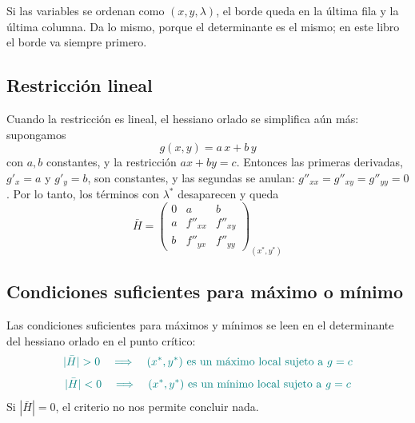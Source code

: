 \documentclass{article}
\begin{document}
Si las variables se ordenan como \((x,y,\lambda)\), el borde queda en la última fila y la última columna. Da lo mismo, porque el determinante es el mismo; en este libro el borde va siempre primero.

\subsection*{Restricción lineal}

Cuando la restricción es lineal, el hessiano orlado se simplifica aún más: supongamos
\[
g(x,y)=a\,x+b\,y
\]
con \(a,b\) constantes, y la restricción \(ax+by=c\). Entonces las primeras derivadas, \(g'_x=a\) y \(g'_y=b\), son constantes, y las segundas se anulan: \(g''_{xx}=g''_{xy}=g''_{yy}=0\). Por lo tanto, los términos con \(\lambda^*\) desaparecen y queda
\[
\bar H
=
\begin{pmatrix}
0 & a & b \\[6pt]
a & f''_{xx} & f''_{xy} \\[6pt]
b & f''_{yx} & f''_{yy}
\end{pmatrix}_{(x^*,y^*)}
\]

\subsection*{Condiciones suficientes para máximo o mínimo}

Las condiciones suficientes para máximos y mínimos se leen en el determinante del hessiano orlado en el punto crítico:
\[\color{teal}
|\bar H|>0
\quad\Longrightarrow\quad
\text{\((x^*,y^*)\) es un máximo local sujeto a }g=c
\]
\[\color{teal}
|\bar H|<0
\quad\Longrightarrow\quad
\text{\((x^*,y^*)\) es un mínimo local sujeto a }g=c
\]
Si \(|\bar H|=0\), el criterio no nos permite concluir nada.

\medskip
\end{document}
